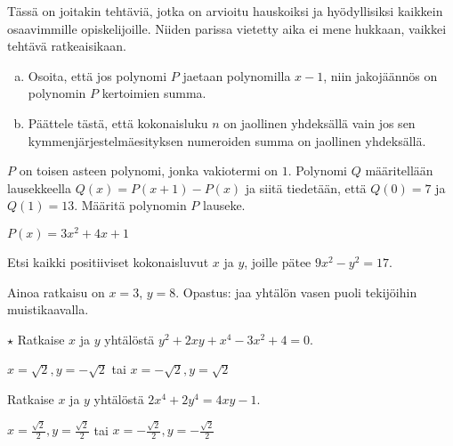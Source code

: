 Tässä on joitakin tehtäviä, jotka on arvioitu hauskoiksi ja hyödyllisiksi kaikkein osaavimmille opiskelijoille. Niiden parissa vietetty aika ei mene hukkaan, vaikkei tehtävä ratkeaisikaan.

\begin{tehtava}
    \begin{enumerate}[a)]
        \item Osoita, että jos polynomi $P$ jaetaan polynomilla $x-1$, niin jakojäännös on polynomin $P$ kertoimien summa.
        \item Päättele tästä, että kokonaisluku $n$ on jaollinen yhdeksällä vain jos sen kymmenjärjestelmäesityksen numeroiden summa on jaollinen yhdeksällä.
    \end{enumerate}
\end{tehtava}

\begin{tehtava}
    $P$ on toisen asteen polynomi, jonka vakiotermi on $1$. Polynomi $Q$ määritellään lausekkeella $Q(x)=P(x+1)-P(x)$ ja siitä tiedetään, että $Q(0)=7$ ja $Q(1)=13$. Määritä polynomin $P$ lauseke.
    \begin{vastaus}
        $P(x) = 3x^2+4x+1$
    \end{vastaus}
\end{tehtava}

\begin{tehtava} %
    Etsi kaikki positiiviset kokonaisluvut $x$ ja $y$, joille pätee $9x^2-y^2=17$.
    \begin{vastaus}
    Ainoa ratkaisu on $x = 3$, $y=8$. Opastus: jaa yhtälön vasen puoli tekijöihin muistikaavalla. 
    \end{vastaus}
\end{tehtava}

\begin{tehtava}
    $\star$ Ratkaise $x$ ja $y$ yhtälöstä $y^2+2xy+x^4-3x^2+4=0$.
    \begin{vastaus}
        $x=\sqrt{2}, y=-\sqrt{2}$ tai $x=-\sqrt{2}, y=\sqrt{2}$
    \end{vastaus}
\end{tehtava}

\begin{tehtava} %
    Ratkaise $x$ ja $y$ yhtälöstä $2x^4+2y^4=4xy-1$. %
    \begin{vastaus}
        $x=\frac{\sqrt{2}}{2}, y=\frac{\sqrt{2}}{2}$ tai $x=-\frac{\sqrt{2}}{2}, y=-\frac{\sqrt{2}}{2}$
    \end{vastaus}
\end{tehtava}


